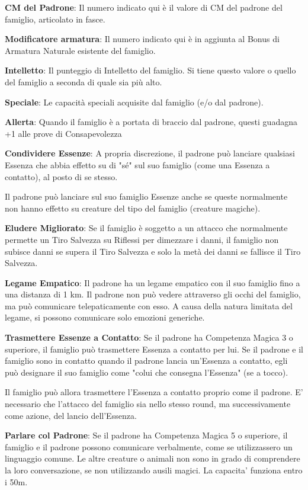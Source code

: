 \documentclass[a4paper,11pt,twoside,openany]{book}
\begin{document}
\textbf{CM del Padrone}: Il numero indicato qui è il valore di CM del padrone del famiglio, articolato in fasce.

\textbf{Modificatore armatura}: Il numero indicato qui è in aggiunta al Bonus di Armatura Naturale esistente del famiglio.

\textbf{Intelletto}: Il punteggio di Intelletto del famiglio. Si tiene questo valore o quello del famiglio a seconda di quale sia più alto.

\textbf{Speciale}: Le capacità speciali acquisite dal famiglio (e/o dal padrone).

\textbf{Allerta}: Quando il famiglio è a portata di braccio dal padrone, questi guadagna +1 alle prove di Consapevolezza

\textbf{Condividere Essenze}: A propria discrezione, il padrone può lanciare qualsiasi Essenza che abbia effetto su di "sé" sul suo famiglio (come una Essenza a contatto), al posto di se stesso.

Il padrone può lanciare sul suo famiglio Essenze anche se queste normalmente non hanno effetto su creature del tipo del famiglio (creature magiche).

\textbf{Eludere Migliorato}: Se il famiglio è soggetto a un attacco che normalmente permette un Tiro Salvezza su Riflessi per dimezzare i danni, il famiglio non subisce danni se supera il Tiro Salvezza e solo la metà dei danni se fallisce il Tiro Salvezza.

\textbf{Legame Empatico}: Il padrone ha un legame empatico con il suo famiglio fino a una distanza di 1 km. Il padrone non può vedere attraverso gli occhi del famiglio, ma può comunicare telepaticamente con esso. A causa della natura limitata del legame, si possono comunicare solo emozioni generiche.

\textbf{Trasmettere Essenze a Contatto}: Se il padrone ha Competenza Magica 3 o superiore, il famiglio può trasmettere Essenza a contatto per lui. Se il padrone e il famiglio sono in contatto quando il padrone lancia un'Essenza a contatto, egli può designare il suo famiglio come "colui che consegna l'Essenza" (se a tocco).

Il famiglio può allora trasmettere l'Essenza a contatto proprio come il padrone. E' necessario che l'attacco del famiglio sia nello stesso round, ma successivamente come azione, del lancio dell'Essenza.

\textbf{Parlare col Padrone}: Se il padrone ha Competenza Magica 5 o superiore, il famiglio e il padrone possono comunicare verbalmente, come se utilizzassero un linguaggio comune. Le altre creature o animali non sono in grado di comprendere la loro conversazione, se non utilizzando ausili magici. La capacita' funziona entro i 50m.
\end{document}
